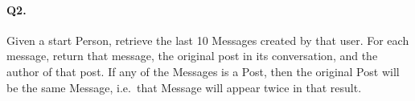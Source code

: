 \paragraph{Q2.}

Given a start Person, retrieve the last 10 Messages created by that
user. For each message, return that message, the original post in its
conversation, and the author of that post. If any of the Messages is a
Post, then the original Post will be the same Message, i.e.~that Message
will appear twice in that result.
